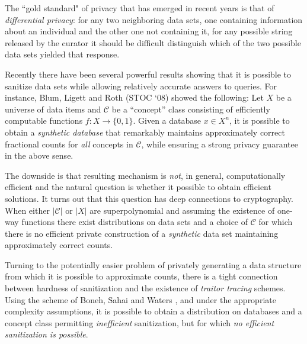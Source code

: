 \documentclass{sig-alternate}
\newcommand{\C}{\mathcal C}
\begin{document}
The ``gold standard" of privacy that has emerged in recent years is that of {\em differential privacy}:
for any two neighboring data sets, one containing information about an individual and the other one not containing it,
for any possible string released by the curator it should be difficult distinguish which of the two possible data sets yielded that response.

Recently there have been several powerful results showing that it is possible to sanitize
data sets while allowing relatively accurate answers to queries.  
For instance, Blum, Ligett and Roth (STOC `08) showed the following:
Let $X$ be a universe of data items and
$\C$ be a ``concept'' class consisting of efficiently computable
functions $f : X\rightarrow \{0,1\}$. 
Given a database $x\in X^n$, it is possible to obtain a {\em synthetic database} that remarkably
maintains approximately correct fractional counts for {\em all} concepts in $\C$, while ensuring a strong privacy guarantee in the above sense. 

The downside is that resulting mechanism is {\em not}, in general,  
computationally efficient and the natural question is whether it possible to obtain efficient solutions.
It turns out that this question has deep connections to cryptography. 
When either $|\C|$ or $|X|$ are superpolynomial and assuming
the existence of one-way functions there exist
distributions on data sets and a choice of $\C$ for which there is no efficient private
construction of a {\em synthetic} data set maintaining approximately correct
counts.

Turning to the potentially easier problem of privately generating a
data structure from which it is possible to approximate counts, there
is a tight connection between hardness of sanitization and the
existence of {\em traitor tracing} schemes. Using the scheme of Boneh, Sahai and Waters \cite{BonehSW06}, and under the 
appropriate  complexity assumptions,  it is possible
to obtain a distribution on
databases and a concept class permitting {\em inefficient} sanitization, but for which {\em no efficient sanitization is
possible}.
\end{document}
